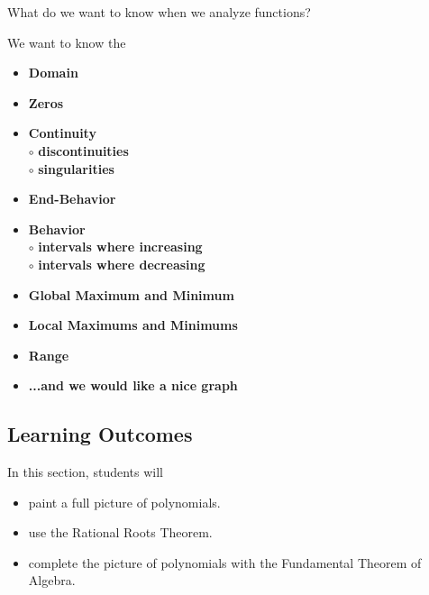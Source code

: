 \documentclass{ximera}
\begin{document}
What do we want to know when we analyze functions?



We want to know the 
\begin{itemize}
     \item \textbf{\textcolor{red!70!black}{Domain}} 
     \item \textbf{\textcolor{red!70!black}{Zeros}} 
     \item \textbf{\textcolor{red!70!black}{Continuity}} \\
     \text{    }$\circ$ \textbf{\textcolor{purple!85!blue}{discontinuities}}\\
     \text{    }$\circ$ \textbf{\textcolor{purple!85!blue}{singularities}}\\
     \item \textbf{\textcolor{red!70!black}{End-Behavior}} 
     \item \textbf{\textcolor{red!70!black}{Behavior}} \\
     \text{    }$\circ$ \textbf{\textcolor{purple!85!blue}{intervals where increasing}}\\
     \text{    }$\circ$ \textbf{\textcolor{purple!85!blue}{intervals where decreasing}}\\
     \item \textbf{\textcolor{red!70!black}{Global Maximum and Minimum}} 
     \item \textbf{\textcolor{red!70!black}{Local Maximums and Minimums}} 
     \item \textbf{\textcolor{red!70!black}{Range}} 
     \item \textbf{\textcolor{blue!55!black}{...and we would like a nice graph}} 
\end{itemize}






\subsection*{Learning Outcomes}

\begin{sectionOutcomes}
In this section, students will 

\begin{itemize}
\item paint a full picture of polynomials.
\item use the Rational Roots Theorem.
\item complete the picture of polynomials with the Fundamental Theorem of Algebra.
\end{itemize}
\end{sectionOutcomes}
\end{document}
